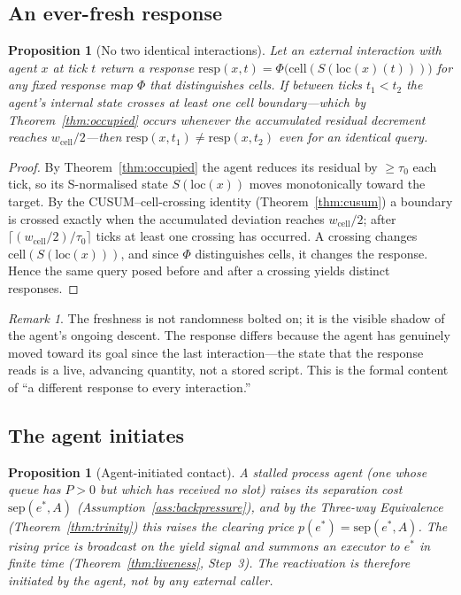 \documentclass[11pt,twocolumn,a4paper]{article}
\theoremstyle{plain}
\newtheorem{proposition}[theorem]{Proposition}
\theoremstyle{definition}
\theoremstyle{remark}
\newtheorem{remark}[theorem]{Remark}
\newcommand{\tick}{\tau_0}
\newcommand{\sep}{\mathrm{sep}}
\newcommand{\cell}{\mathrm{cell}}
\newcommand{\Scal}{S}
\newcommand{\pres}{P}
\begin{document}
\subsection{An ever-fresh response}

\begin{proposition}[No two identical interactions]
\label{prop:fresh}
Let an external interaction with agent $x$ at tick $t$ return a response
$\mathrm{resp}(x, t) = \Phi\bigl(\cell(\Scal(\mathrm{loc}(x)(t)))\bigr)$ for any
fixed response map $\Phi$ that distinguishes cells. If between ticks $t_1 < t_2$ the
agent's internal state crosses at least one cell boundary---which by
Theorem~\ref{thm:occupied} occurs whenever the accumulated residual decrement
reaches $w_{\cell}/2$---then $\mathrm{resp}(x, t_1) \neq \mathrm{resp}(x, t_2)$ even
for an identical query.
\end{proposition}

\begin{proof}
By Theorem~\ref{thm:occupied} the agent reduces its residual by $\geq \tick$ each
tick, so its S-normalised state $\Scal(\mathrm{loc}(x))$ moves monotonically toward
the target. By the CUSUM--cell-crossing identity (Theorem~\ref{thm:cusum}) a
boundary is crossed exactly when the accumulated deviation reaches $w_{\cell}/2$;
after $\lceil (w_{\cell}/2)/\tick \rceil$ ticks at least one crossing has occurred.
A crossing changes $\cell(\Scal(\mathrm{loc}(x)))$, and since $\Phi$ distinguishes
cells, it changes the response. Hence the same query posed before and after a
crossing yields distinct responses.
\end{proof}

\begin{remark}
The freshness is not randomness bolted on; it is the visible shadow of the agent's
ongoing descent. The response differs because the agent has genuinely moved toward
its goal since the last interaction---the state that the response reads is a live,
advancing quantity, not a stored script. This is the formal content of ``a
different response to every interaction.''
\end{remark}

\subsection{The agent initiates}

\begin{proposition}[Agent-initiated contact]
\label{prop:hail}
A stalled process agent (one whose queue has $\pres > 0$ but which has received no
slot) raises its separation cost $\sep(e^*, A)$
(Assumption~\ref{ass:backpressure}), and by the Three-way Equivalence
(Theorem~\ref{thm:trinity}) this raises the clearing price $p(e^*) = \sep(e^*, A)$.
The rising price is broadcast on the yield signal and \emph{summons} an executor to
$e^*$ in finite time (Theorem~\ref{thm:liveness}, Step~3). The reactivation is
therefore \emph{initiated by the agent}, not by any external caller.
\end{proposition}
\end{document}
